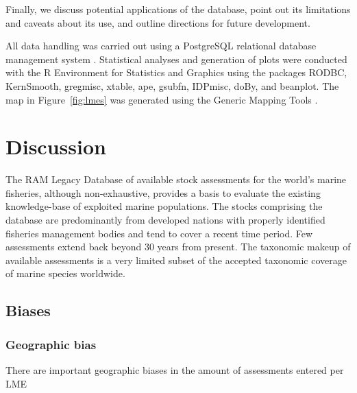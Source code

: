 \documentclass[letterpaper,12pt]{article}
\begin{document}

Finally, we discuss potential applications of the database, point out
its limitations and caveats about its use, and outline directions for
future development.

All data handling was carried out using a PostgreSQL relational
database management system \citep{postgresql:2009}. Statistical
analyses and generation of plots were conducted with the R Environment
for Statistics and Graphics \citep{R} using the packages RODBC,
KernSmooth, gregmisc, xtable, ape, gsubfn, IDPmisc, doBy, and
beanplot. The map in Figure~\ref{fig:lmes} was generated using the
Generic Mapping Tools \citep{gmt}.





\newpage
\section*{Discussion}

The RAM Legacy Database of available stock assessments for the world's
marine fisheries, although non-exhaustive, provides a basis to
evaluate the existing knowledge-base of exploited marine populations.
The stocks comprising the database are predominantly from developed
nations with properly identified fisheries management bodies and tend
to cover a recent time period. Few assessments extend back beyond 30
years from present. The taxonomic makeup of available assessments is a
very limited subset of the accepted taxonomic coverage of marine
species worldwide.

\subsection*{Biases}
\subsubsection*{Geographic bias}

There are important geographic biases in the amount of assessments entered per LME
\end{document}
